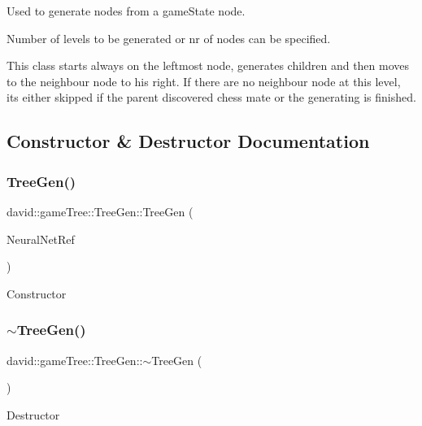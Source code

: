 Used to generate nodes from a game\+State node.

Number of levels to be generated or nr of nodes can be specified.

This class starts always on the leftmost node, generates children and then moves to the neighbour node to his right. If there are no neighbour node at this level, it\textquotesingle{}s either skipped if the parent discovered chess mate or the generating is finished. 

\subsection{Constructor \& Destructor Documentation}
\mbox{\label{classdavid_1_1gameTree_1_1TreeGen_a83ab2152e0a57671f7b38a0c24c2bb3b}} 
\subsubsection{\texorpdfstring{Tree\+Gen()}{TreeGen()}}
{\footnotesize\ttfamily david\+::game\+Tree\+::\+Tree\+Gen\+::\+Tree\+Gen (\begin{DoxyParamCaption}\item[{const \hyperlink{classdavid_1_1ANN}{type\+::\+Neural\+Network\+\_\+t} \&}]{Neural\+Net\+Ref }\end{DoxyParamCaption})}

Constructor \mbox{\label{classdavid_1_1gameTree_1_1TreeGen_ad9d485261d15b5837e4aec4d46912ad5}} 
\subsubsection{\texorpdfstring{$\sim$\+Tree\+Gen()}{~TreeGen()}}
{\footnotesize\ttfamily david\+::game\+Tree\+::\+Tree\+Gen\+::$\sim$\+Tree\+Gen (\begin{DoxyParamCaption}{ }\end{DoxyParamCaption})}

Destructor 


